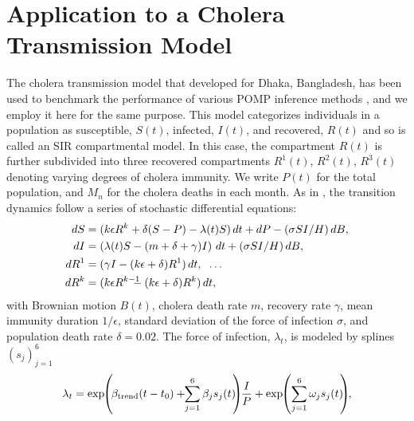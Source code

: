 \documentclass[11pt]{article}
\begin{document}
\section{Application to a Cholera Transmission Model}

The cholera transmission model that \cite{king08} developed for Dhaka, Bangladesh, has been used to benchmark the performance of various POMP inference methods \cite{ionides15, wood16, wycoff24}, and we employ it here for the same purpose.
This model categorizes individuals in a population as susceptible, $S(t)$, infected, $I(t)$, and recovered, $R(t)$ and so is called an SIR compartmental model.
In this case, the compartment $R(t)$ is further subdivided into 
three recovered compartments $R^1(t)$, $R^2(t)$, $R^3(t)$ denoting varying degrees of cholera immunity.
We write $P(t)$ for the total population, and $M_n$ for the cholera deaths in each month.
As in \cite{king08, ionides15}, the transition dynamics follow a series of stochastic differential equations:
\vspace*{-1mm}
\begin{align*}
    dS&=(k \epsilon R^k+\delta(S-P)-\lambda(t) S)\, dt+d P-({\sigma S I}/{H})\, dB, \\
    dI&=\left(\lambda(t) S-(m+\delta+\gamma) I\right)\, dt+({\sigma S I}/{H})\, dB, \\
    dR^1&=(\gamma I-(k \epsilon+\delta) R^1)\, dt, \hspace{2mm} \dots \\
    dR^k&=(k \epsilon R^{k-1}\hspace{-3mm}-(k \epsilon+\delta) R^k)\, dt,
    \vspace*{-2mm}
\end{align*}
with Brownian motion $B(t)$, cholera death rate $m$, recovery rate $\gamma$, mean immunity duration $1/\epsilon$, standard deviation of the force of infection $\sigma$, and population death rate $\delta=0.02$. The force of infection, $\lambda_t$, is modeled by splines $(s_j)_{j=1}^6$
\vspace*{-2mm}
\begin{equation*}
    \lambda_t=\exp\hspace{-1mm}\left(\hspace{-.5mm}\beta_{\text{trend}}(t-t_0)+\hspace{-1mm}\sum_{j=1}^{6} \beta_j s_j(t)\hspace{-1mm}\right)\hspace{-1mm}\frac{I}{P} + \exp\hspace{-1mm} \left(\sum_{j=1}^{6} \omega_j s_j(t)\hspace{-1mm}\right)\hspace{-1mm},
    \vspace*{-2mm}
\end{equation*}
\end{document}
